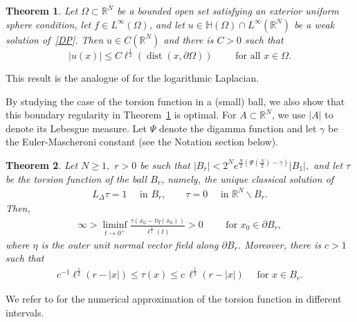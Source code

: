 \documentclass[11pt]{article}
\newcommand{\R}{\mathbb{R}}
\numberwithin{equation}{section}
\newtheorem{theorem}{Theorem}[section]
\begin{document}
\begin{theorem}\label{convex:thm}
Let $\Omega\subset \R^N$ be a bounded open set satisfying an exterior uniform sphere condition, let $f \in L^\infty(\Omega)$, and let $u\in {\mathbb H}(\Omega)\cap L^\infty(\R^N)$ be a weak solution of~\eqref{DP}. Then $u\in C(\R^N)$ and there is $C>0$ such that
\begin{equation}\label{eq:boundary_bound}
    |u(x)|\leq C\ell^{\frac{1}{2}}(\operatorname{dist}(x,\partial \Omega))\qquad \text{ for all }x\in \Omega.
\end{equation}    
\end{theorem}
This result is the analogue of \cite[Lemma 2.7]{RS14} for the logarithmic Laplacian.

By studying the case of the torsion function in a (small) ball, we also show that this boundary regularity in Theorem~\ref{convex:thm} is optimal. For $A\subset \R^N$, we use $|A|$ to denote its Lebesgue measure. Let $\Psi$ denote the digamma function and let $\gamma$ be the Euler-Mascheroni constant (see the Notation section below).

\begin{theorem} \label{torsion:ball}
Let $N\geq 1,$ $r>0$ be such that $|B_r|<2^N e^{\frac{N}{2}(\Psi(\frac{N}{2})-\gamma)}|B_1|,$ and let $\tau$ be the torsion function of the ball $B_r$, namely, the unique classical solution of 
\begin{align}\label{tau:eq}
    L_\Delta \tau = 1\quad \text{ in }B_r,\qquad \tau=0\quad \text{ in }\R^N \backslash B_r.
\end{align}
Then,
\begin{align}\label{liminf}
\infty>\liminf_{t\to 0^+} \frac{\tau(x_0-t\eta(x_0))}{\ell^\frac{1}{2}(t)}>0\qquad \text{ for }x_0\in\partial B_r,
\end{align}
where $\eta$ is the outer unit normal vector field along $\partial B_r$.  Moreover, there is $c>1$ such that
\begin{align}\label{tau:bds}
c^{-1}\ell^{\frac{1}{2}}(r-|x|)\leq \tau(x)\leq c\,\ell^{\frac{1}{2}}(r-|x|)\quad \text{ for }x\in B_r.
\end{align}
\end{theorem}
We refer to \cite[Figure 1]{HJSS23} for the numerical approximation of the torsion function in different intervals. 
\end{document}
